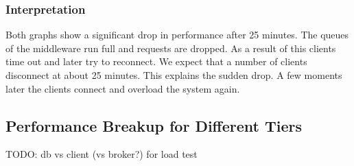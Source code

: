 \documentclass[milestone1.tex]{subfiles}
\begin{document}
\subsubsection{Interpretation}
Both graphs show a significant drop in performance after 25 minutes. The queues of the middleware run full and requests are dropped. As a result of this clients time out and later try to reconnect. We expect that a number of clients disconnect at about 25 minutes. This explains the sudden drop. A few moments later the clients connect and overload the system again.

\subsection{Performance Breakup for Different Tiers}

TODO: db vs client (vs broker?) for load test
\end{document}
